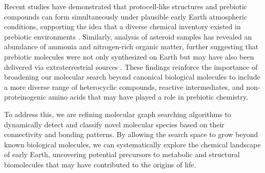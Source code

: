 Recent studies have demonstrated that protocell-like structures and prebiotic compounds can form simultaneously under plausible early Earth atmospheric conditions, supporting the idea that a diverse chemical inventory existed in prebiotic environments \cite{prebiotic_compounds_EE_atmosphere}. Similarly, analysis of asteroid samples has revealed an abundance of ammonia and nitrogen-rich organic matter, further suggesting that prebiotic molecules were not only synthesized on Earth but may have also been delivered via extraterrestrial sources \cite{astroid_sample}. These findings reinforce the importance of broadening our molecular search beyond canonical biological molecules to include a more diverse range of heterocyclic compounds, reactive intermediates, and non-proteinogenic amino acids that may have played a role in prebiotic chemistry.

To address this, we are refining molecular graph searching algorithms to dynamically detect and classify novel molecular species based on their connectivity and bonding patterns. By allowing the search space to grow beyond known biological molecules, we can systematically explore the chemical landscape of early Earth, uncovering potential precursors to metabolic and structural biomolecules that may have contributed to the origins of life.